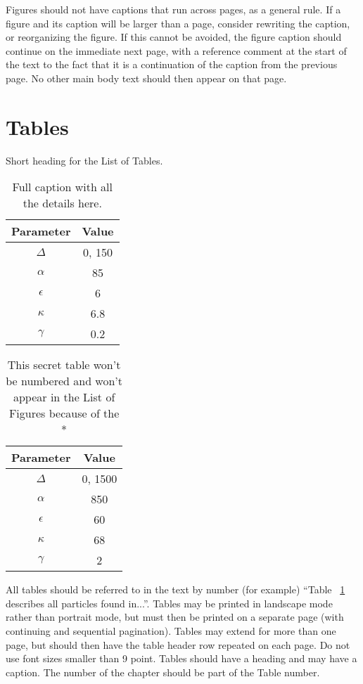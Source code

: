 Figures should not have captions that run across pages, as a general rule. If a figure and its caption will be larger than a page, consider rewriting the caption, or reorganizing the figure.  If this cannot be avoided, the figure caption should continue on the immediate next page, with a reference comment at the start of the text to the fact that it is a continuation of the caption from the previous page.  No other main body text should then appear on that page.

\section{Tables}

\begin{table} 
\center
\caption{Short heading for the List of Tables.}
\begin{tabular}{c|c}
Parameter & Value \\ \hline \hline
$\Delta$ & 0, 150 \\
${\alpha}$ & 85 \\
${\epsilon}$ & 6 \\
${\kappa}$ & 6.8 \\
${\gamma}$ & 0.2
\end{tabular}
\label{tab-values}
\caption*{Full caption with all the details here.}
\end{table}

\begin{table} \center
\begin{tabular}{c|c}
Parameter & Value \\ \hline \hline
$\Delta$ & 0, 1500 \\
${\alpha}$ & 850 \\
${\epsilon}$ & 60 \\
${\kappa}$ & 68 \\
${\gamma}$ & 2
\end{tabular}
\caption*{This secret table won't be numbered and won't appear in the List of Figures because of the * }
\end{table}

All tables should be referred to in the text by number (for example) ``Table ~\ref{tab-values} describes all particles found in...''.  Tables may be printed in landscape mode rather than portrait mode, but must then be printed on a separate page (with continuing and sequential pagination). Tables may extend for more than one page, but should then have the table header row repeated on each page. Do not use font sizes smaller than 9 point. Tables should have a heading and may have a caption.  The number of the chapter should be part of the Table number.


